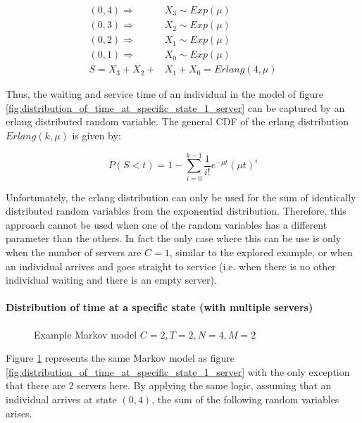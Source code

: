 \begin{align}
    (0,4) \Rightarrow \quad & X_3 \sim Exp(\mu) \nonumber \\
    (0,3) \Rightarrow \quad & X_2 \sim Exp(\mu) \nonumber \\
    (0,2) \Rightarrow \quad & X_1 \sim Exp(\mu) \nonumber \\
    (0,1) \Rightarrow \quad & X_0 \sim Exp(\mu) \nonumber \\
    S = X_3 + X_2 + & X_1 + X_0 = Erlang(4, \mu)
\end{align}

Thus, the waiting and service time of an individual in the model of figure
\ref{fig:distribution_of_time_at_specific_state_1_server} can be captured by an
erlang distributed random variable.
The general CDF of the erlang distribution \(Erlang(k, \mu)\) is given by:

\begin{equation} \label{eq:cdf_erlang}
    P(S < t) = 1 - \sum_{i=0}^{k-1} \frac{1}{i!} e^{-\mu t} (\mu t)^i
\end{equation}

Unfortunately, the erlang distribution can only be used for the sum of
identically distributed random variables from the exponential distribution.
Therefore, this approach cannot be used when one of the random variables has a
different parameter than the others.
In fact the only case where this can be use is only when the number of servers 
are \(C=1\), similar to the explored example, or when an individual arrives
and goes straight to service (i.e. when there is no other individual waiting
and there is an empty server).


\paragraph{Distribution of time at a specific state (with multiple servers)}

\begin{figure}[h]
    \centering
    \scalebox{0.75}{}
    \caption{Example Markov model \(C=2, T=2, N=4, M=2\)}
    \label{fig:distribution_of_time_at_specific_state_2_servers}
\end{figure}

Figure \ref{fig:distribution_of_time_at_specific_state_2_servers} represents the
same Markov model as figure
\ref{fig:distribution_of_time_at_specific_state_1_server} with the only
exception that there are 2 servers here.
By applying the same logic, assuming that an individual arrives at state
\((0,4)\), the sum of the following random variables arises.

